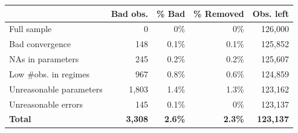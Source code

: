 \begin{tabular}{@{\extracolsep{\fill}}l|rrrr}
\toprule
 & Bad obs. & \% Bad & \% Removed & Obs. left \\ 
\midrule\addlinespace[2.5pt]
Full sample & 0 & 0\% & 0\% & 126,000 \\ 
Bad convergence & 148 & 0.1\% & 0.1\% & 125,852 \\ 
NAs in parameters & 245 & 0.2\% & 0.2\% & 125,607 \\ 
Low \#obs. in regimes & 967 & 0.8\% & 0.6\% & 124,859 \\ 
Unreasonable parameters & 1,803 & 1.4\% & 1.3\% & 123,162 \\ 
Unreasonable errors & 145 & 0.1\% & 0\% & 123,137 \\ 
{\bfseries Total} & {\bfseries 3,308} & {\bfseries 2.6\%} & {\bfseries 2.3\%} & {\bfseries 123,137} \\ 
\bottomrule
\end{tabular}
